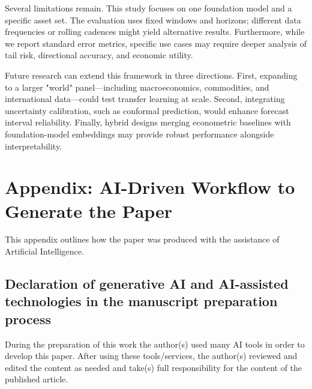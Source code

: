 \documentclass[twocolumn]{article}
\begin{document}
Several limitations remain. This study focuses on one foundation model and a specific asset set. The evaluation uses fixed windows and horizons; different data frequencies or rolling cadences might yield alternative results. Furthermore, while we report standard error metrics, specific use cases may require deeper analysis of tail risk, directional accuracy, and economic utility.

Future research can extend this framework in three directions. First, expanding to a larger "world" panel—including macroeconomics, commodities, and international data—could test transfer learning at scale. Second, integrating uncertainty calibration, such as conformal prediction, would enhance forecast interval reliability. Finally, hybrid designs merging econometric baselines with foundation-model embeddings may provide robust performance alongside interpretability.


\clearpage

\balance



\clearpage
\appendix

\section{Appendix: AI-Driven Workflow to Generate the Paper}
\label{ai_workflow}

This appendix outlines how the paper was produced with the assistance of Artificial Intelligence.

\subsection*{Declaration of generative AI and AI-assisted technologies in the manuscript preparation process}
During the preparation of this work the author(s) used many AI tools in order to develop this paper. After using these tools/services, the author(s) reviewed and edited the content as needed and take(s) full responsibility for the content of the published article.

\end{document}
